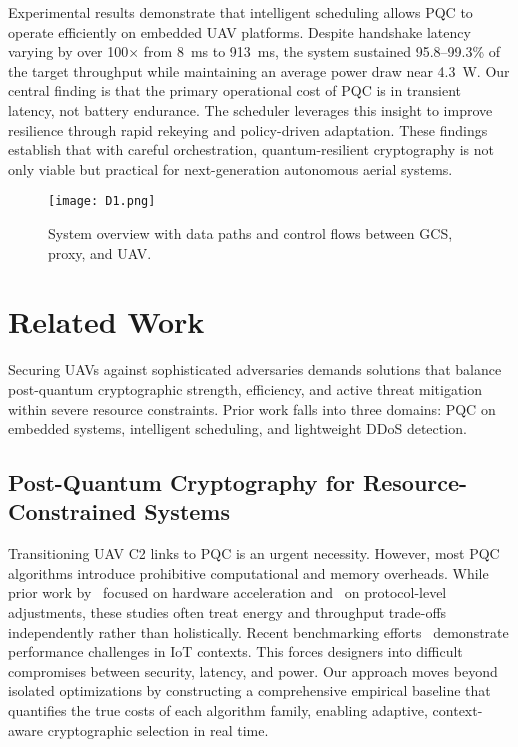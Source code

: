 \documentclass[sigconf,natbib=false]{acmart}
\begin{document}
Experimental results demonstrate that intelligent scheduling allows PQC to operate efficiently on embedded UAV platforms. Despite handshake latency varying by over 100$\times$ from 8~ms to 913~ms, the system sustained 95.8--99.3\% of the target throughput while maintaining an average power draw near 4.3~W. Our central finding is that the primary operational cost of PQC is in transient latency, not battery endurance. The scheduler leverages this insight to improve resilience through rapid rekeying and policy-driven adaptation. These findings establish that with careful orchestration, quantum-resilient cryptography is not only viable but practical for next-generation autonomous aerial systems.

\begin{figure}[h]
  \centering
  \texttt{[image: D1.png]}
  \caption{System overview with data paths and control flows between GCS, proxy, and UAV.}
  \label{fig:system_overview}
\end{figure}


\section{Related Work}

Securing UAVs against sophisticated adversaries demands solutions that balance post-quantum cryptographic strength, efficiency, and active threat mitigation within severe resource constraints. Prior work falls into three domains: PQC on embedded systems, intelligent scheduling, and lightweight DDoS detection.

\subsection{Post-Quantum Cryptography for Resource-Constrained Systems}

Transitioning UAV C2 links to PQC is an urgent necessity. However, most PQC algorithms introduce prohibitive computational and memory overheads. While prior work by~\cite{dilithium_cortexm_tches2021} focused on hardware acceleration and~\cite{pqm4_2019,faster_kyber_dilithium_m4_2022} on protocol-level adjustments, these studies often treat energy and throughput trade-offs independently rather than holistically. Recent benchmarking efforts~\cite{iot_pqtls_2023} demonstrate performance challenges in IoT contexts. This forces designers into difficult compromises between security, latency, and power. Our approach moves beyond isolated optimizations by constructing a comprehensive empirical baseline that quantifies the true costs of each algorithm family, enabling adaptive, context-aware cryptographic selection in real time.
\end{document}
